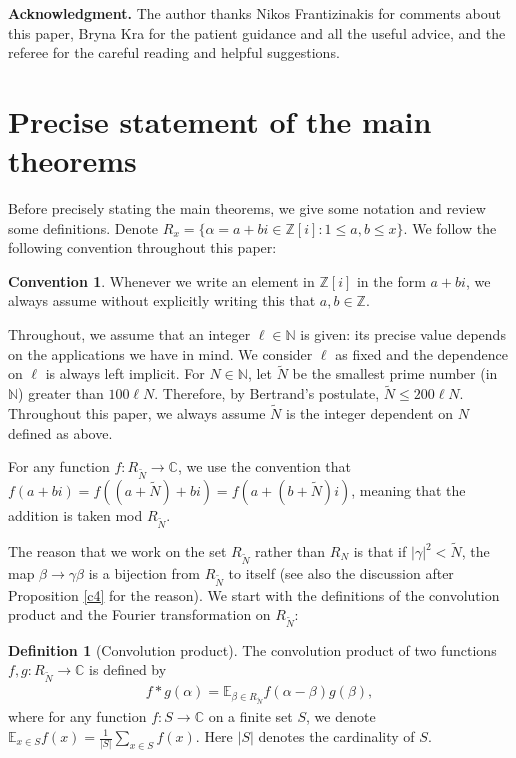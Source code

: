 \documentclass[12pt,amstex]{amsart}
\theoremstyle{definition}
\newtheorem{defn}[thm]{Definition}
\newtheorem{conv}[thm]{Convention}
\def \Z {\mathbb{Z}[i]}
\def \N {\mathbb{N}}
\def \A {\alpha}
\def \B {\beta}
\def \C {\gamma}
\def \R {R_{\tilde{N}}}
\begin{document}
\textbf{Acknowledgment.} The author thanks Nikos Frantizinakis for comments about this paper, Bryna Kra for the patient guidance and all the useful advice, and the referee for the careful reading and helpful suggestions.

\section{Precise statement of the main theorems}
Before precisely stating the main theorems, we give some notation and review some definitions.
Denote $R_{x}=\{\A=a+bi\in\Z\colon 1\leq a, b\leq x\}$.
We follow the following convention throughout this paper:

\begin{conv}\label{conv}
Whenever we write an element in $\Z$ in the form $a+bi$, we always assume without explicitly writing this that $a,b\in\mathbb{Z}$.

Throughout, we assume that an integer $\ell\in\mathbb{N}$ is given: its precise value depends on the applications we have in mind. We consider $\ell$ as fixed and the dependence on $\ell$ is always left implicit.
For $N\in\N$, let $\tilde{N}$ be the
smallest prime number (in $\N$) greater than $100\ell N$. Therefore, by Bertrand's postulate, $\tilde{N}\leq 200\ell N$.
Throughout this paper, we always assume $\tilde{N}$ is the integer dependent on $N$ defined as above.

For any function $f\colon\R\rightarrow\mathbb{C}$, we use the convention that $f(a+bi)=f((a+\tilde{N})+bi)=f(a+(b+\tilde{N})i)$, meaning that the addition is taken mod $\R$.
\end{conv}

The reason that we work on the set $\R$ rather than $R_{N}$ is that if $\vert\gamma\vert^{2}<\tilde{N}$, the map $\B\to\C\B$ is a bijection from $\R$ to itself (see also the discussion after Proposition \ref{c4} for the reason).
We start with the definitions of the convolution product and the Fourier transformation on $\R$:

\begin{defn}[Convolution product] The convolution product of two functions $f,g\colon\R\rightarrow\mathbb{C}$ is defined by
  \begin{equation}\nonumber
  \begin{split}
   f*g(\A)=\mathbb{E}_{\B\in \R}f(\A-\B)g(\B),
  \end{split}
  \end{equation}
where for any function $f\colon S\rightarrow\mathbb{C}$ on a finite set $S$, we denote $\mathbb{E}_{x\in S}f(x)=\frac{1}{\vert S\vert}\sum_{x\in S}f(x)$.
Here $\vert S\vert$ denotes the cardinality of $S$.
\end{defn}
\end{document}

